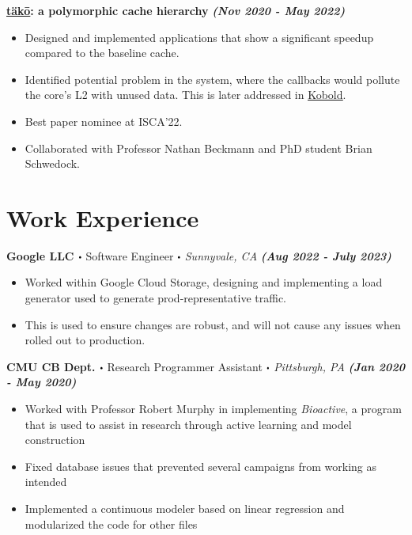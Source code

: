 \documentclass[10pt]{article}
\newcommand\sbullet[1][.5]{\mathbin{\vcenter{\hbox{\scalebox{#1}{$\bullet$}}}}}
\begin{document}
  \textbf{\large \href{https://dl.acm.org/doi/10.1145/3470496.3527379}{\underline{täkō}}: a polymorphic cache hierarchy} {\hfill \textit{\textbf{(Nov 2020 - May 2022)}}} 
  \vspace*{-0.17cm}
  \begin{itemize}
    \itemsep0em
    \item \textcolor{lighterG}{Designed and implemented applications that show a significant speedup compared to the baseline cache.}
    \item \textcolor{lighterG}{Identified potential problem in the system, where the callbacks would pollute the core's L2 with unused data. This is later addressed in \href{https://ieeexplore.ieee.org/document/10106564}{\underline{Kobold}}.}
    \item \textcolor{lighterG}{Best paper nominee at ISCA'22.}
    \item \textcolor{lighterG}{Collaborated with Professor Nathan Beckmann and PhD student Brian Schwedock.}
  \end{itemize}

  \vspace*{-0.55cm}
  \section*{\Large \textcolor{lighterB} {Work Experience}}
  \vspace*{-0.23cm}

\textbf{\large Google LLC $\sbullet$} {\large Software Engineer $\sbullet$ \textit{Sunnyvale, CA}} {\hfill \textit{\textbf{(Aug 2022 - July 2023)}}}

  \vspace*{-0.2cm}
  \begin{itemize}
    \itemsep-0.4em
\item \textcolor{lighterG}{Worked within Google Cloud Storage, designing and implementing a load generator used to generate prod-representative traffic.}
    \item \textcolor{lighterG}{This is used to ensure changes are robust, and will not cause any issues when rolled out to production.}
  \end{itemize}

\textbf{\large CMU CB Dept. $\sbullet$} {\large Research Programmer Assistant $\sbullet$ \textit{Pittsburgh, PA}} {\hfill \textit{\textbf{(Jan 2020 - May 2020)}}}

  \vspace*{-0.2cm}
  \begin{itemize}
    \itemsep-0.4em
    \item \textcolor{lighterG}{Worked with Professor Robert Murphy in implementing \textit{Bioactive}, a program that is used to assist in research through active learning and model construction}
    \item \textcolor{lighterG}{Fixed database issues that prevented several campaigns from working as intended}
    \item \textcolor{lighterG}{Implemented a continuous modeler based on linear regression and modularized the code for other files}
  \end{itemize}
\end{document}
